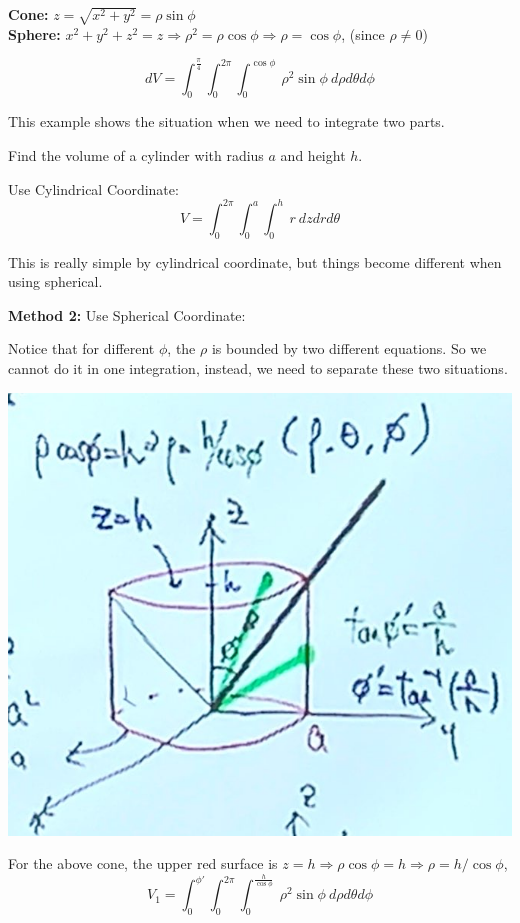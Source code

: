 \begin{spacing}{1.3}
    {\bf Cone:} $z=\sqrt{x^2+y^2}=\rho \sin\phi$\\
    {\bf Sphere:} $x^2+y^2+z^2=z \Rightarrow \rho^2 = \rho \cos\phi \Rightarrow \rho=\cos\phi$, (since $\rho\ne 0$)

    $$dV=\int_0^{\frac{\pi}{4}} \int_0^{2\pi} \int_0^{\cos\phi}\ \rho^2 \sin\phi \ d\rho d\theta d\phi$$

    \newpage
    {\blue This example shows the situation when we need to integrate two parts.}

    \eg Find the volume of a cylinder with radius $a$ and height $h$.

     Use Cylindrical Coordinate: 
    $$V=\int_0^{2\pi} \int_0^a \int_0^h\ r\ dzdrd\theta$$

    This is really simple by cylindrical coordinate, but things become different when using spherical.

    {\bf Method 2:} Use Spherical Coordinate: 

    Notice that for different $\phi$, the $\rho$ is bounded by two different equations.
    So we cannot do it in one integration, instead, we need to separate these two situations.
    \begin{center}
        \includegraphics[scale=0.25]{images/Ch14-int-sphere-cylinder.JPG}
    \end{center}
    For the above cone, the upper red surface is $z=h\Rightarrow \rho\cos\phi=h\Rightarrow \rho=h/{\cos\phi}$,
    $$V_1=\int_0^{\phi'}\int_0^{2\pi}\int_0^{\frac{h}{\cos\phi}}\ \rho^2\sin\phi\ d\rho d\theta d\phi$$


\end{spacing}
